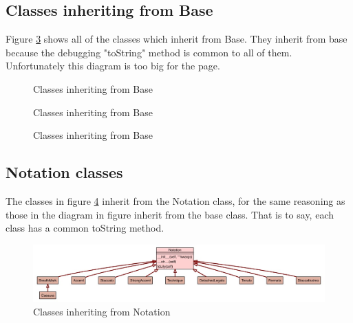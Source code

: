 \begin{appendices}
\begin{landscape}
\subsection{Classes inheriting from Base}
Figure \ref{fig:base} shows all of the classes which inherit from Base. They inherit from base because the debugging "toString" method is common to all of them. Unfortunately this diagram is too big for the page.
\begin{figure}[H]
\caption{Classes inheriting from Base}
\end{figure}
\begin{figure}[H]

\label{fig:base}
\end{figure}
\begin{figure}[H]
  
\caption{Classes inheriting from Base}
\label{fig:base}
\end{figure}
\begin{figure}[H]
  
\caption{Classes inheriting from Base}
\label{fig:base}
\end{figure}
\subsection{Notation classes}
The classes in figure \ref{fig:notation} inherit from the Notation class, for the same reasoning as those in the diagram in figure \label{fig:base} inherit from the base class. That is to say, each class has a common toString method.
\begin{figure}[h]
\includegraphics[width=700pt]{diagrams/jpegs/uml_class_diagram_for_implemen_34}	
\caption{Classes inheriting from Notation}
\label{fig:notation}
\end{figure}
\end{landscape}


\end{appendices}
